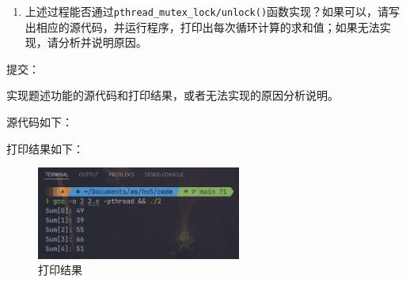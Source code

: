 \begin{enumerate}
    \item 上述过程能否通过{\tt pthread_mutex_lock/unlock()}函数实现？如果可以，请写出相应的源代码，并运行程序，打印出每次循环计算的求和值；如果无法实现，请分析并说明原因。
\end{enumerate}

提交：

实现题述功能的源代码和打印结果，或者无法实现的原因分析说明。

\begin{solution}

源代码如下：


打印结果如下：
\begin{figure}[H]
    \centering
    \includegraphics[width=0.6\textwidth]{img/2.png}
    \caption{打印结果}
\end{figure}

\end{solution}

